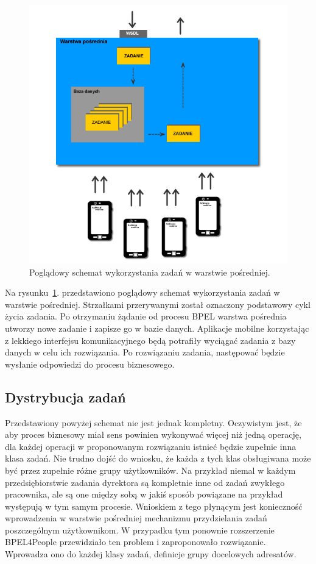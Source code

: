 \begin{figure}[h]
\centerline{\includegraphics[scale=0.5]{middlewareTasksConceptDiagram}}
\caption{Poglądowy schemat wykorzystania zadań w warstwie pośredniej.}
\label{fig:middlewareTasksConceptDiagram}
\end{figure}

Na rysunku~\ref{fig:middlewareTasksConceptDiagram}. przedstawiono poglądowy schemat wykorzystania zadań w warstwie pośredniej. Strzałkami przerywanymi został oznaczony podstawowy cykl życia zadania. Po otrzymaniu żądanie od procesu BPEL warstwa pośrednia utworzy nowe zadanie i zapisze go w bazie danych. Aplikacje mobilne korzystając z lekkiego interfejsu komunikacyjnego będą potrafiły wyciągać zadania z bazy danych w celu ich rozwiązania. Po rozwiązaniu zadania, następować będzie wysłanie odpowiedzi do procesu biznesowego. 

\subsection{Dystrybucja zadań}
Przedstawiony powyżej schemat nie jest jednak kompletny. Oczywistym jest, że aby proces biznesowy miał sens powinien wykonywać więcej niż jedną operację, dla każdej operacji w proponowanym rozwiązaniu istnieć będzie zupełnie inna klasa zadań. Nie trudno dojść do wniosku, że każda z tych klas obsługiwana może być przez zupełnie różne grupy użytkowników. Na przykład niemal w każdym przedsiębiorstwie zadania dyrektora są kompletnie inne od zadań zwykłego pracownika, ale są one między sobą w jakiś sposób powiązane na przykład występują w tym samym procesie. Wnioskiem z tego płynącym jest konieczność wprowadzenia w warstwie pośredniej mechanizmu przydzielania zadań poszczególnym użytkownikom. W przypadku tym ponownie rozszerzenie BPEL4People przewidziało ten problem i zaproponowało rozwiązanie. Wprowadza ono do każdej klasy zadań, definicje grupy docelowych adresatów. 

